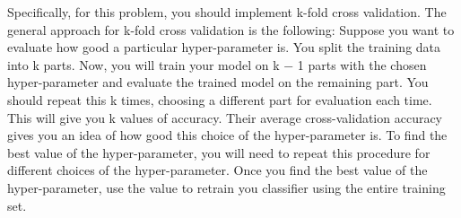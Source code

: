 Specifically, for this problem, you should implement k-fold cross validation.
The general approach for k-fold cross validation is the following: Suppose you want to evaluate how good a particular hyper-parameter is.
You split the training data into k parts.
Now, you will train your model on k − 1 parts with the chosen hyper-parameter and evaluate the trained model on the remaining part.
You should repeat this k times, choosing a different part for evaluation each time.
This will give you k values of accuracy.
Their average cross-validation accuracy gives you an idea of how good this choice of the hyper-parameter is.
To find the best value of the hyper-parameter, you will need to repeat this procedure for different choices of the hyper-parameter.
Once you find the best value of the hyper-parameter, use the value to retrain you classifier using the entire training set.

